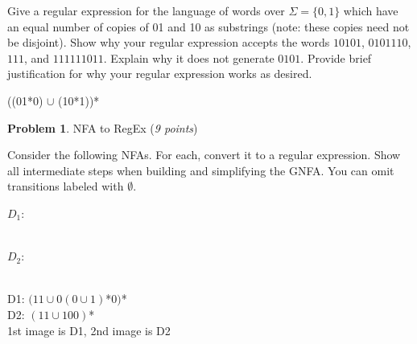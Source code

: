 \documentclass[11pt]{article}
\theoremstyle{definition}
\theoremstyle{theorem}
\newtheorem{prob}{Problem}
\newcommand{\solution}{\medskip\noindent{\color{blue}\textbf{Solution:}}}
\begin{document}
Give a regular expression for the language of words over $\Sigma = \{0, 1\}$ which have an equal number of copies of 01 and 10 as substrings (note: these copies need not be disjoint). Show why your regular expression accepts the words $10101$, $0101110$, $111$, and $111111011$. Explain why it does not generate $0101$. Provide brief justification for why your regular expression works as desired.

\solution

((01*0) $\cup$ (10*1))*



\newpage

\begin{prob} NFA to RegEx (\emph{9 points})\end{prob}

Consider the following NFAs. For each, convert it to a regular expression. Show all intermediate steps when building and simplifying the GNFA. You can omit transitions labeled with $\emptyset$.

$D_1$:

\\

$D_2$:




\solution \\
\noindent D1: $(11 \cup 0(0 \cup 1)$*$0)$*  \\ D2: $(11\cup100)$* \\ 1st image is D1, 2nd image is D2
\end{document}
